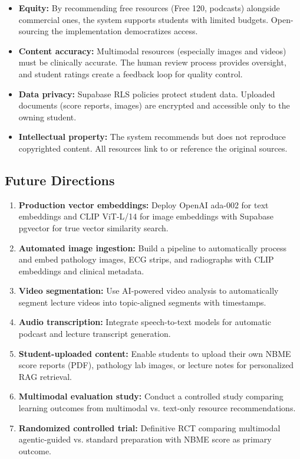 \begin{itemize}
    \item \textbf{Equity:} By recommending free resources (Free 120, podcasts) alongside commercial ones, the system supports students with limited budgets. Open-sourcing the implementation democratizes access.
    
    \item \textbf{Content accuracy:} Multimodal resources (especially images and videos) must be clinically accurate. The human review process provides oversight, and student ratings create a feedback loop for quality control.
    
    \item \textbf{Data privacy:} Supabase RLS policies protect student data. Uploaded documents (score reports, images) are encrypted and accessible only to the owning student.
    
    \item \textbf{Intellectual property:} The system recommends but does not reproduce copyrighted content. All resources link to or reference the original sources.
\end{itemize}

\subsection{Future Directions}

\begin{enumerate}
    \item \textbf{Production vector embeddings:} Deploy OpenAI ada-002 for text embeddings and CLIP ViT-L/14 for image embeddings with Supabase pgvector for true vector similarity search.
    
    \item \textbf{Automated image ingestion:} Build a pipeline to automatically process and embed pathology images, ECG strips, and radiographs with CLIP embeddings and clinical metadata.
    
    \item \textbf{Video segmentation:} Use AI-powered video analysis to automatically segment lecture videos into topic-aligned segments with timestamps.
    
    \item \textbf{Audio transcription:} Integrate speech-to-text models for automatic podcast and lecture transcript generation.
    
    \item \textbf{Student-uploaded content:} Enable students to upload their own NBME score reports (PDF), pathology lab images, or lecture notes for personalized RAG retrieval.
    
    \item \textbf{Multimodal evaluation study:} Conduct a controlled study comparing learning outcomes from multimodal vs. text-only resource recommendations.
    
    \item \textbf{Randomized controlled trial:} Definitive RCT comparing multimodal agentic-guided vs. standard preparation with NBME score as primary outcome.
\end{enumerate}
